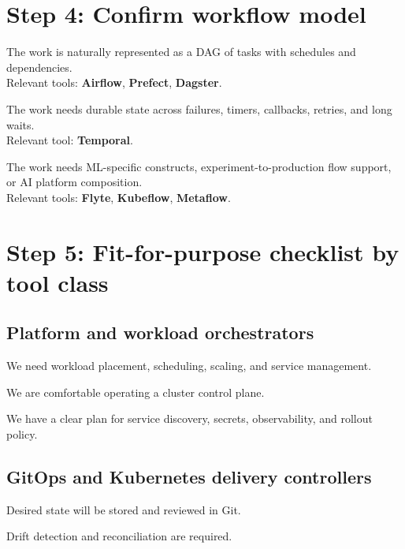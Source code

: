 \documentclass[11pt]{article}
\newcommand{\checkbox}{\makebox[1.6em][l]{\(\square\)}}
\newcommand{\tool}[1]{\textbf{#1}}
\begin{document}
\section{Step 4: Confirm workflow model}
\checkbox The work is naturally represented as a DAG of tasks with schedules and dependencies.\\
\hspace*{1.2em}Relevant tools: \tool{Airflow}, \tool{Prefect}, \tool{Dagster}.\cite{AirflowArchitecture,PrefectQuickstart,DagsterOverview}

\checkbox The work needs durable state across failures, timers, callbacks, retries, and long waits.\\
\hspace*{1.2em}Relevant tool: \tool{Temporal}.\cite{TemporalWhatIs,TemporalWorkflowExecution}

\checkbox The work needs ML-specific constructs, experiment-to-production flow support, or AI platform composition.\\
\hspace*{1.2em}Relevant tools: \tool{Flyte}, \tool{Kubeflow}, \tool{Metaflow}.\cite{FlyteOSS,KubeflowIntro,MetaflowWhatIs}

\section{Step 5: Fit-for-purpose checklist by tool class}

\subsection{Platform and workload orchestrators}
\checkbox We need workload placement, scheduling, scaling, and service management.\cite{KubernetesOverview,NomadWhatIs,DockerSwarm}

\checkbox We are comfortable operating a cluster control plane.\cite{KubernetesOverview,DockerSwarm}

\checkbox We have a clear plan for service discovery, secrets, observability, and rollout policy.

\subsection{GitOps and Kubernetes delivery controllers}
\checkbox Desired state will be stored and reviewed in Git.\cite{ArgoCDHome,ArgoCDDeclarative}

\checkbox Drift detection and reconciliation are required.\cite{ArgoCDHome}
\end{document}
